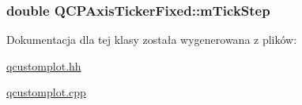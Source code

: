 \subsubsection[{\texorpdfstring{m\+Tick\+Step}{mTickStep}}]{\setlength{\rightskip}{0pt plus 5cm}double Q\+C\+P\+Axis\+Ticker\+Fixed\+::m\+Tick\+Step\hspace{0.3cm}{\ttfamily [protected]}}\hypertarget{class_q_c_p_axis_ticker_fixed_a4aeef2d3eaa57ec56f422ab1f82175d2}{}\label{class_q_c_p_axis_ticker_fixed_a4aeef2d3eaa57ec56f422ab1f82175d2}


Dokumentacja dla tej klasy została wygenerowana z plików\+:\begin{DoxyCompactItemize}
\item 
\hyperlink{qcustomplot_8hh}{qcustomplot.\+hh}\item 
\hyperlink{qcustomplot_8cpp}{qcustomplot.\+cpp}\end{DoxyCompactItemize}

